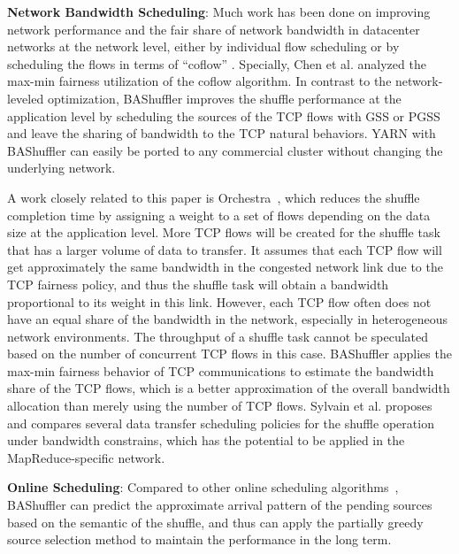 \documentclass[10pt,journal,compsoc]{IEEEtran}
\begin{document}
\textbf{Network Bandwidth Scheduling}:
Much work has been done on
improving network performance and the fair share of network bandwidth
in datacenter networks at the network level, 
either by individual flow scheduling \cite{greenberg2009vl2, popa2012faircloud, shieh2011sharing,ballani2011towards} 
or by scheduling the flows in terms of ``coflow'' \cite{dogar2014decentralized, chowdhury2014efficient, Qiu:2015:MTW, chowdhury2015efficient, zhao2015rapier, chen2016coflow}. 
Specially, Chen et al. \cite{chen2016coflow} analyzed the max-min fairness utilization of the coflow algorithm. 
In contrast to the network-leveled optimization, BAShuffler improves the shuffle performance at the application
level by scheduling the sources
of the TCP flows with GSS or PGSS and leave the sharing of bandwidth
to the TCP natural behaviors.
YARN with BAShuffler can easily be ported to any commercial cluster
without changing the underlying network.


A work closely related to this paper is Orchestra~\cite{chowdhury2011managing}, which reduces the shuffle completion
time by assigning a weight to a set of flows
depending on the data size at the application level. 
More TCP flows will be created for the shuffle task that has a larger
volume of data to transfer.
It assumes that each TCP flow will get approximately the same bandwidth 
in the congested network link due to the TCP fairness policy, 
and thus the shuffle task will obtain a bandwidth proportional to
its weight in this link.
However, each TCP flow often does not have an equal share
of the bandwidth in the network,
especially in heterogeneous network environments. 
The throughput of a shuffle task cannot be speculated based on the
number of concurrent TCP flows in this case.
BAShuffler applies the max-min fairness behavior of TCP communications
to estimate the bandwidth share of the TCP flows,
which is a better approximation of the overall bandwidth allocation
than merely using the number of TCP flows.
Sylvain et al. \cite{gault2014dynamic} proposes and compares several data transfer scheduling policies for the shuffle operation under bandwidth constrains, 
which has the potential to be applied in the MapReduce-specific network. 


\textbf{Online Scheduling}:
Compared to other online scheduling algorithms~\cite{wu2007scheduling,sgall1998line},
BAShuffler can predict the approximate arrival pattern of the pending
sources based on the semantic of the shuffle,
and thus can apply the partially greedy source selection method to
maintain the performance in the long term.
\end{document}
